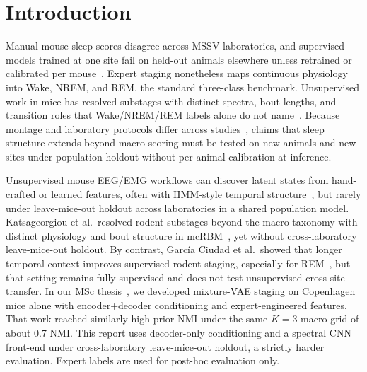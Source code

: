 \documentclass[10pt,letterpaper]{article}
\newif\ifreportmode
\newif\ifreportmode
\newcommand{\papersection}[1]{\section{#1}}
\newcommand{\papersection}[1]{\section*{#1}}
\begin{document}
\ifreportmode\else{}\fi
\linenumbers

\papersection{Introduction}

Manual mouse sleep scores disagree across MSSV laboratories, and supervised models trained at one site fail on held-out animals elsewhere unless retrained or calibrated per mouse~\cite{rose2026consensus,miladinovic2019spindle,wang2026rest,barger2019accusleep,yaghouby2016segway}.
Expert staging nonetheless maps continuous physiology into Wake, NREM, and REM, the standard three-class benchmark.
Unsupervised work in mice has resolved substages with distinct spectra, bout lengths, and transition roles that Wake/NREM/REM labels alone do not name~\cite{katsageorgiou2018mcRBM}.
Because montage and laboratory protocols differ across studies~\cite{rose2025mssv}, claims that sleep structure extends beyond macro scoring must be tested on new animals and new sites under population holdout without per-animal calibration at inference.

Unsupervised mouse EEG/EMG workflows can discover latent states from hand-crafted or learned features, often with HMM-style temporal structure~\cite{cusinato2024wucss}, but rarely under leave-mice-out holdout across laboratories in a shared population model.
Katsageorgiou et al.\ resolved rodent substages beyond the macro taxonomy with distinct physiology and bout structure in mcRBM~\cite{katsageorgiou2018mcRBM}, yet without cross-laboratory leave-mice-out holdout.
By contrast, Garc\'ia Ciudad et al.\ showed that longer temporal context improves supervised rodent staging, especially for REM~\cite{garciaciudad2024temporal}, but that setting remains fully supervised and does not test unsupervised cross-site transfer.
In our MSc thesis~\cite{elmgreen2026thesis}, we developed mixture-VAE staging on Copenhagen mice alone with encoder+decoder conditioning and expert-engineered features.
That work reached similarly high prior NMI under the same $K{=}3$ macro grid of about 0.7 NMI.
This report uses decoder-only conditioning and a spectral CNN front-end under cross-laboratory leave-mice-out holdout, a strictly harder evaluation.
Expert labels are used for post-hoc evaluation only.
\end{document}
